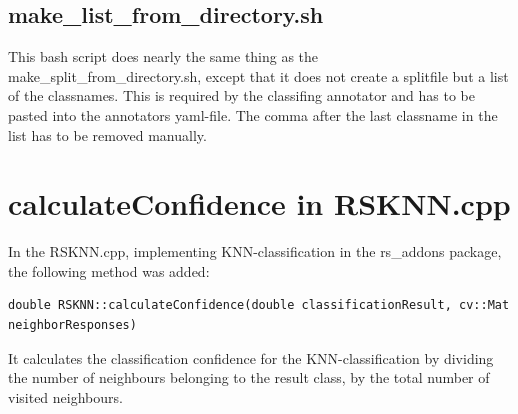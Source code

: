 \documentclass[main.tex]{subfiles}
\begin{document}
\begin{itemize}
\subsection{make\_list\_from\_directory.sh}
This bash script does nearly the same thing as the make\_split\_from\_directory.sh, except that it does not create a splitfile but a list of the classnames. This is required by the classifing annotator and has to be pasted into the annotators yaml-file. The comma after the last classname in the list has to be removed manually.

\section{calculateConfidence in RSKNN.cpp}
In the RSKNN.cpp, implementing KNN-classification in the rs\_addons package, the following method was added:

\begin{lstlisting}
double RSKNN::calculateConfidence(double classificationResult, cv::Mat neighborResponses)
\end{lstlisting}

It calculates the classification confidence for the KNN-classification by dividing the number of neighbours belonging to the result class, by the total number of visited neighbours. 



\end{itemize}

		
		
	\endgroup
\end{document}
